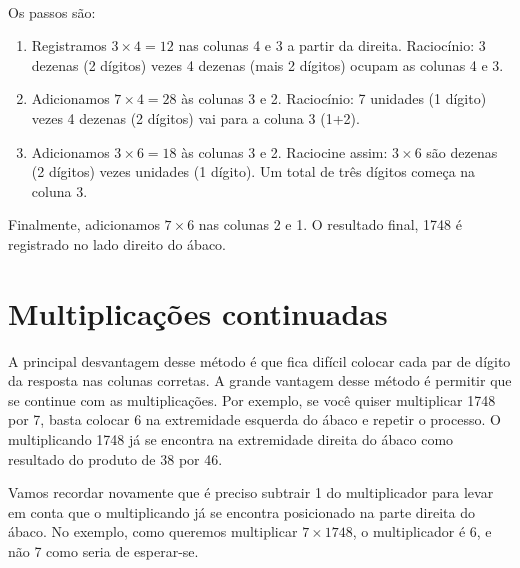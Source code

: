 \documentclass[12pt]{book}
\begin{document}
\verb||\\
Os passos são:
\begin{enumerate}
\item Registramos $3\times 4= 12$ nas colunas 4 e 3
  a partir da direita. Raciocínio: 3 dezenas (2 dígitos)
  vezes 4 dezenas (mais 2 dígitos) ocupam as
  colunas 4 e 3.
\item Adicionamos $7\times 4= 28$ às colunas 3 e 2.
  Raciocínio: 7 unidades (1 dígito) vezes
  4 dezenas (2 dígitos) vai para a coluna 3 (1+2).
\item Adicionamos $3\times 6= 18$ às colunas 3 e 2.
  Raciocine assim: $3\times 6$ são dezenas (2 dígitos)
  vezes unidades (1 dígito). Um total de três dígitos
  começa na coluna 3.
\end{enumerate}

\vspace{0.2cm}
\begin{minipage}{0.5\textwidth}
\end{minipage}%
%
\begin{minipage}{0.4\textwidth}
  Finalmente, adicionamos $7\times 6$
  nas colunas 2 e 1. O resultado final,
  1748 é registrado no lado direito
  do ábaco.
\end{minipage}

\vspace{0.5cm}
\section{Multiplicações continuadas}
A principal desvantagem desse método é
que fica difícil colocar cada par de dígito
da resposta nas colunas corretas.
A grande vantagem desse método é permitir que
se continue com as multiplicações. Por exemplo,
se você quiser multiplicar 1748 por 7, basta
colocar 6 na extremidade esquerda do ábaco
e repetir o processo. O multiplicando 1748
já se encontra na extremidade direita do
ábaco como resultado do produto de 38 por 46.

Vamos recordar novamente
que é preciso subtrair 1 do multiplicador
para levar em conta que o multiplicando
já se encontra posicionado na parte
direita do ábaco. No exemplo, como
queremos multiplicar $7\times 1748$, o multiplicador
é 6, e não 7 como seria de esperar-se.
\end{document}
